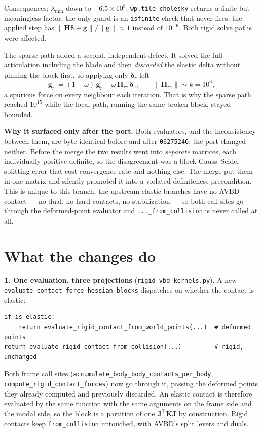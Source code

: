\documentclass[11pt,a4paper]{article}
\begin{document}
Consequences: $\lambda_{\min}$ down to $-6.5\times10^{8}$;
\texttt{wp.tile\_cholesky} returns a finite but meaningless factor; the only
guard is an \texttt{isfinite} check that never fires; the applied step has
$\|\mathbf{H}\bm{\delta}+\mathbf{g}\|/\|\mathbf{g}\|\approx 1$ instead of
$10^{-6}$. Both rigid solve paths were affected.

The sparse path added a second, independent defect. It solved the full
articulation including the blade and then \emph{discarded} the elastic delta
without pinning the block first, so applying only $\bm{\delta}_r$ left
\[
  \mathbf{g}_r^{+} = (1-\omega)\,\mathbf{g}_r - \omega\,\mathbf{H}_{re}\,\bm{\delta}_e,
  \qquad \|\mathbf{H}_{re}\|\sim k = 10^{6},
\]
a spurious force on every neighbour each iteration. That is why the sparse path
reached $10^{15}$ while the local path, running the same broken block, stayed
bounded.

\textbf{Why it surfaced only after the port.} Both evaluators, and the
inconsistency between them, are byte-identical before and after
\texttt{06275246}; the port changed neither. Before the merge the two results
went into \emph{separate} matrices, each individually positive definite, so the
disagreement was a block Gauss--Seidel splitting error that cost convergence
rate and nothing else. The merge put them in one matrix and silently promoted it
into a violated definiteness precondition. This is unique to this branch: the
upstream elastic branches have no AVBD contact --- no dual, no hard contacts, no
stabilization --- so both call sites go through the deformed-point evaluator and
\texttt{...\_from\_collision} is never called at all.

\section*{What the changes do}

\textbf{1. One evaluation, three projections} (\texttt{rigid\_vbd\_kernels.py}).
A new \texttt{evaluate\_contact\_force\_hessian\_blocks} dispatches on whether
the contact is elastic:

\begin{lstlisting}
if is_elastic:
    return evaluate_rigid_contact_from_world_points(...)  # deformed points
return evaluate_rigid_contact_from_collision(...)         # rigid, unchanged
\end{lstlisting}

Both frame call sites (\texttt{accumulate\_body\_body\_contacts\_per\_body},
\texttt{compute\_rigid\_contact\_forces}) now go through it, passing the
deformed points they already computed and previously discarded. An elastic
contact is therefore evaluated by the same function with the same arguments on
the frame side and the modal side, so the block is a partition of one
$\mathbf{J}^\top\mathbf{K}\mathbf{J}$ by construction. Rigid contacts keep
\texttt{from\_collision} untouched, with AVBD's split levers and duals.
\end{document}
